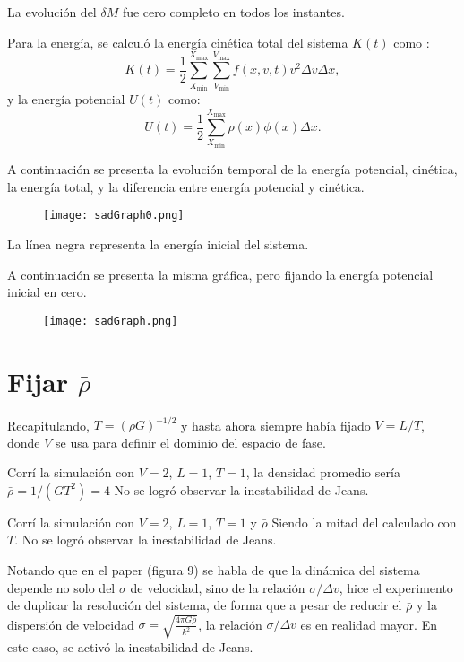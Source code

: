 \documentclass[notitlepage,letterpaper,12pt]{article} %
\begin{document}
La evolución del $\delta M$ fue cero completo  en todos los instantes.

Para la energía, se calculó la energía cinética total del sistema $K(t)$ como :
\begin{equation}
K(t) = \frac{1}{2} \sum_{X_\text{min}}^{X_\text{max}} \sum_{V_\text{min}}^{V_\text{max}} f(x,v,t) v^2 \Delta v \Delta x,
\end{equation}
y la energía potencial $U(t)$ como:
\begin{equation}
U(t) = \frac{1}{2} \sum_{X_\text{min}}^{X_\text{max}} \rho(x) \phi(x) \Delta x.
\end{equation}



A continuación se presenta la evolución temporal de la energía potencial, cinética, la energía total, y la diferencia entre energía potencial y cinética. 


\begin{figure}[h]
  \centering
   \texttt{[image: sadGraph0.png]}
  \label{sadGraph0}
\end{figure}

La línea negra representa la energía inicial del sistema.

A continuación se presenta la misma gráfica, pero fijando la energía potencial inicial en cero.

\begin{figure}[h]
  \centering
   \texttt{[image: sadGraph.png]}
  \label{sadGraph}
\end{figure}

\newpage

\section{Fijar $\bar{\rho}$}
Recapitulando, $T = (\bar{\rho} G)^{-1/2}$ y hasta ahora siempre había fijado $V = L/T$, donde $V$ se usa para definir el dominio del espacio de fase.

Corrí la simulación con $V = 2$, $L = 1$, $T =1$, la densidad promedio sería $\bar{\rho} = 1/(G T^2) = 4$ 
No se logró observar la inestabilidad de Jeans.


Corrí la simulación con $V = 2$, $L = 1$, $T =1$ y $\bar{\rho}$ Siendo la mitad del calculado con $T$. 
No se logró observar la inestabilidad de Jeans.

Notando que en el paper \citet{2013ApJ...762..116Y} (figura 9) se habla de que la dinámica del sistema depende no solo del $\sigma$ de velocidad, sino de la relación $\sigma / \Delta v$, hice el experimento de duplicar la resolución del sistema, de forma que a pesar de reducir el $\bar{\rho}$ y la dispersión de velocidad $\sigma = \sqrt{\frac{4 \pi G \bar{\rho}}{k^2}}$, la relación $\sigma / \Delta v$ es en realidad mayor.
En este caso, se activó la inestabilidad de Jeans.
\end{document}
